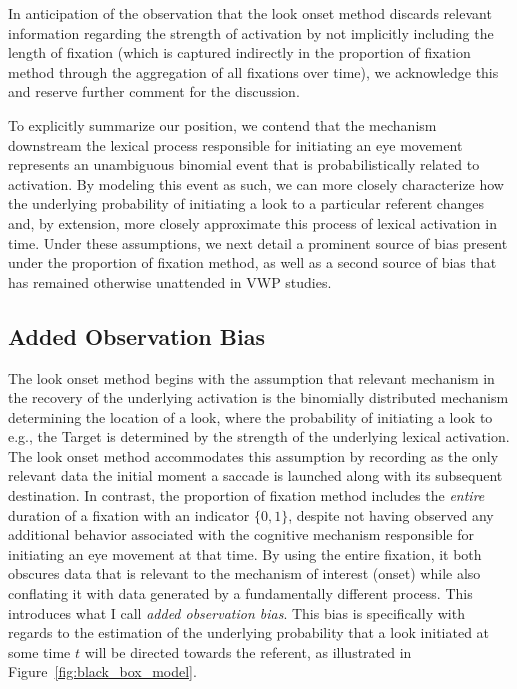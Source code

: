 In anticipation of the observation that the look onset method discards relevant information regarding the strength of activation by not implicitly including the length of fixation (which is captured indirectly in the proportion of fixation method through the aggregation of all fixations over time), we acknowledge this and reserve further comment for the discussion.

To explicitly summarize our position, we contend that the mechanism downstream the lexical process responsible for initiating an eye movement represents an unambiguous binomial event that is probabilistically related to activation. By modeling this event as such, we can more closely characterize how the underlying probability of initiating a look to a particular referent changes and, by extension, more closely approximate this process of lexical activation in time. Under these assumptions, we next detail a prominent source of bias present under the proportion of fixation method, as well as a second source of bias that has remained otherwise unattended in VWP studies. 

\subsection{Added Observation Bias}

The look onset method begins with the assumption that relevant mechanism in the recovery of the underlying activation is the binomially distributed mechanism determining the location of a look, where the probability of initiating a look to e.g., the Target is determined by the strength of the underlying lexical activation. The look onset method accommodates this assumption by recording as the only relevant data the initial moment a saccade is launched along with its subsequent destination. In contrast, the proportion of fixation method includes the \textit{entire} duration of a fixation with an indicator $\{0,1\}$, despite not having observed any additional behavior associated with the cognitive mechanism responsible for initiating an eye movement at that time. By using the entire fixation, it both obscures data that is relevant to the mechanism of interest (onset) while also conflating it with data generated by a fundamentally different process. This introduces what I call \textit{added observation bias}. This bias is specifically with regards to the estimation of the underlying probability that a look initiated at some time $t$ will be directed towards the referent, as illustrated in Figure~\ref{fig:black_box_model}.


